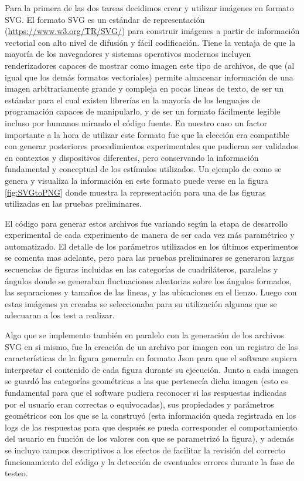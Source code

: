 \documentclass{article}
\begin{document}
    Para la primera de las dos tareas decidimos crear y utilizar imágenes en formato SVG. El formato SVG es un estándar de representación (\url{https://www.w3.org/TR/SVG/}) para construir imágenes a partir de información vectorial con alto nivel de difusión y fácil codificación. Tiene la ventaja de que la mayoría de los navegadores y sistemas operativos modernos incluyen renderizadores capaces de mostrar como imagen este tipo de archivos, de que (al igual que los demás formatos vectoriales) permite almacenar información de una imagen arbitrariamente grande y compleja en pocas lineas de texto, de ser un estándar para el cual existen librerías en la mayoría de los lenguajes de programación capaces de manipularlo, y de ser un formato fácilmente legible incluso por humanos mirando el código fuente. En nuestro caso un factor importante a la hora de utilizar este formato fue que la elección era compatible con generar posteriores procedimientos experimentales que pudieran ser validados en contextos y dispositivos diferentes, pero conservando la información fundamental y conceptual de los estímulos utilizados. Un ejemplo de como se genera y visualiza la información en este formato puede verse en la figura \ref{fig:SVGtoPNG} donde muestra la representación para una de las figuras utilizadas en las pruebas preliminares. 
    
    El código para generar estos archivos fue variando según la etapa de desarrollo experimental de cada experimento de manera de ser cada vez más paramétrico y automatizado. El detalle de los parámetros utilizados en los últimos experimentos se comenta mas adelante, pero para las pruebas preliminares se generaron largas secuencias de figuras incluidas en las categorías de cuadriláteros, paralelas y ángulos donde se generaban fluctuaciones aleatorias sobre los ángulos formados, las separaciones y tamaños de las lineas, y las ubicaciones en el lienzo. Luego con estas imágenes ya creadas se seleccionaba para su utilización algunas que se adecuaran a los test a realizar.
    
    Algo que se implemento también en paralelo con la generación de los archivos SVG en si mismo, fue la creación de un archivo por imagen con un registro de las características de la figura generada en formato Json para que el software supiera interpretar el contenido de cada figura durante su ejecución. Junto a cada imagen se guardó las categorías geométricas a las que pertenecía dicha imagen (esto es fundamental para que el software pudiera reconocer si las respuestas indicadas por el usuario eran correctas o equivocadas), sus propiedades y parámetros geométricos con los que se la construyó (esta información queda registrada en los logs de las respuestas para que después se pueda corresponder el comportamiento del usuario en función de los valores con que se parametrizó la figura), y además se incluyo campos descriptivos a los efectos de facilitar la revisión del correcto funcionamiento del código y la detección de eventuales errores durante la fase de testeo. 
    
\end{document}

